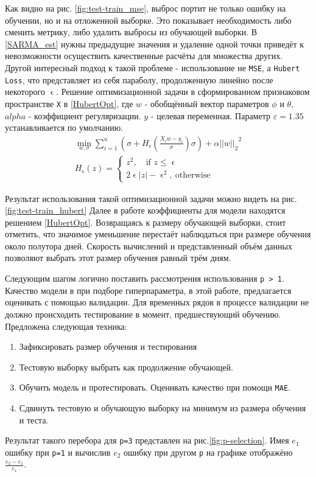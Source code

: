 \documentclass[14pt, a4paper]{extarticle}
\renewcommand{\leq}{\leqslant}
\begin{document}
	Как видно на рис. \ref{fig:test-train_mse}, выброс портит не только ошибку на обучении, но и на отложенной выборке. Это показывает необходимость либо сменить метрику, либо удалить выбросы из обучающей выборки.
	В \ref{SARMA_est} нужны предыдущие значения и удаление одной точки приведёт к невозможности осуществить качественные расчёты для множества других. 
	Другой интересный подход к такой проблеме - использование не \texttt{MSE}, а \texttt{Hubert Loss}, что представляет из себя параболу, продолженную линейно после некоторого $\upvarepsilon$.
	Решение оптимизационной задачи в сформированном признаковом пространстве \texttt{X} в \ref{HubertOpt}, где $w$ - обобщённый вектор параметров $\phi$ и $\theta$, $alpha$ - коэффициент регуляризации.
	$y$ - целевая переменная.
	Параметр $\varepsilon=1.35$ устанавливается по умолчанию. 
	\begin{align}
	\min_{w, \sigma} {\sum_{i=1}^n\left(\sigma + H_{\epsilon}\left(\frac{X_{i}w - y_{i}}{\sigma}\right)\sigma\right) + \alpha {||w||_2}^2}\label{HubertOpt}\\
	H_{\upvarepsilon}(z) = 
	\begin{cases}
	z^2,  \quad\text{if }z \leq \upvarepsilon\\
	2\upvarepsilon|z| - \upvarepsilon^2, \ \text{otherwise}\
	\end{cases} \nonumber
	\end{align}
	
	Результат использования такой оптимизационной задачи можно видеть на рис.\ref{fig:test-train_hubert} Далее в работе коэффициенты для модели находятся решением \ref{HubertOpt}. Возвращаясь к размеру обучающей выборки, стоит отметить, что значимое уменьшение перестаёт наблюдаться при размере обучения около полутора дней. Скорость вычислений и представленный объём данных позволяют выбрать этот размер обучения равный трём дням.
	
	Следующим шагом логично поставить рассмотрения использования \texttt{p > 1}. 
	Качество модели в при подборе гиперпараметра, в этой работе, предлагается оценивать с помощью валидации. 
	Для временных рядов в процессе валидации не должно происходить тестирование в момент, предшествующий обучению. 
	Предложена следующая техника:
	\begin{enumerate}
		\item Зафиксировать размер обучения и тестирования
		\item Тестовую выборку выбрать как продолжение обучающей. 
		\item Обучить модель и протестировать. Оценивать качество при помощи \texttt{MAE}.
		\item Сдвинуть тестовую и обучающую выборку на минимум из размера обучения и теста.
	\end{enumerate}
	Результат такого перебора для \texttt{p=3} представлен на рис.\ref{fig:p-selection}.
	Имея $e_1$ ошибку при \texttt{p=1} и вычислив $e_2$ ошибку при другом \texttt{p} на графике отображёно $\frac{e_2 - e_1}{e_1}$.
	
\end{document}
